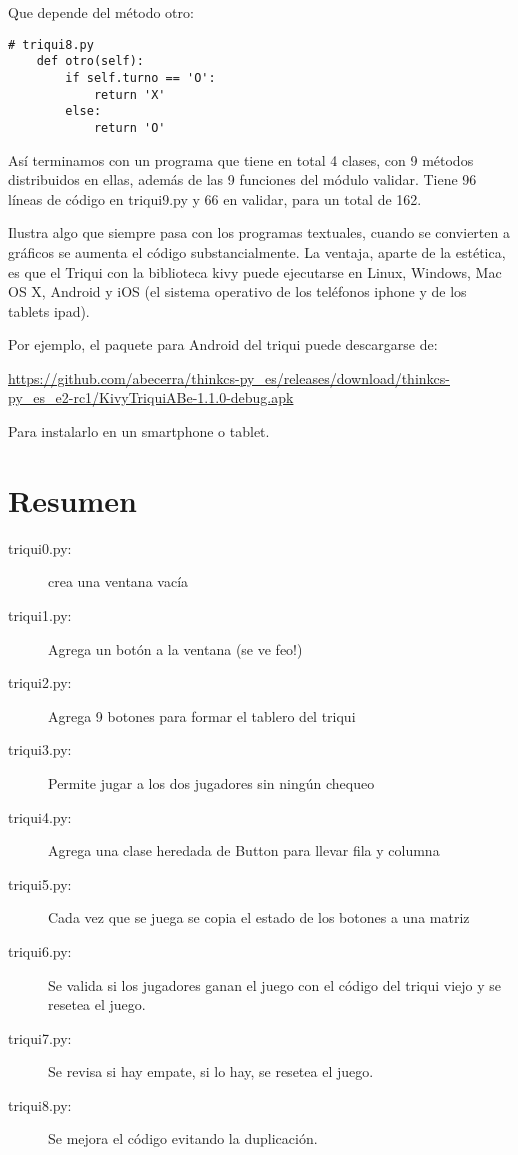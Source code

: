 Que depende del método otro:

\begin{verbatim}
# triqui8.py
    def otro(self):
        if self.turno == 'O':
            return 'X'
        else:
            return 'O'
\end{verbatim}

Así terminamos con un programa que tiene en total 4 clases, con 9
métodos distribuidos en ellas, además de las 9 funciones del módulo
validar. Tiene 96 líneas de código en triqui9.py y 66 en validar,
para un total de 162.

Ilustra algo que siempre pasa con los programas textuales, cuando
se convierten a gráficos se aumenta el código substancialmente. La
ventaja, aparte de la estética, es que el Triqui con la biblioteca
kivy puede ejecutarse en Linux, Windows, Mac OS X, Android y iOS (el
sistema operativo de los teléfonos iphone y de los tablets ipad).

Por ejemplo, el paquete para Android del triqui puede descargarse
de:

\url{https://github.com/abecerra/thinkcs-py_es/releases/download/thinkcs-py_es_e2-rc1/KivyTriquiABe-1.1.0-debug.apk}

Para instalarlo en un smartphone o tablet.

\section{Resumen}
\begin{description}
\item [{triqui0.py:}] crea una ventana vacía 
\item [{triqui1.py:}] Agrega un botón a la ventana (se ve feo!) 
\item [{triqui2.py:}] Agrega 9 botones para formar el tablero del triqui 
\item [{triqui3.py:}] Permite jugar a los dos jugadores sin ningún chequeo 
\item [{triqui4.py:}] Agrega una clase heredada de Button para llevar fila
y columna 
\item [{triqui5.py:}] Cada vez que se juega se copia el estado de los botones
a una matriz 
\item [{triqui6.py:}] Se valida si los jugadores ganan el juego con el
código del triqui viejo y se resetea el juego. 
\item [{triqui7.py:}] Se revisa si hay empate, si lo hay, se resetea el
juego. 
\item [{triqui8.py:}] Se mejora el código evitando la duplicación. 
\end{description}

